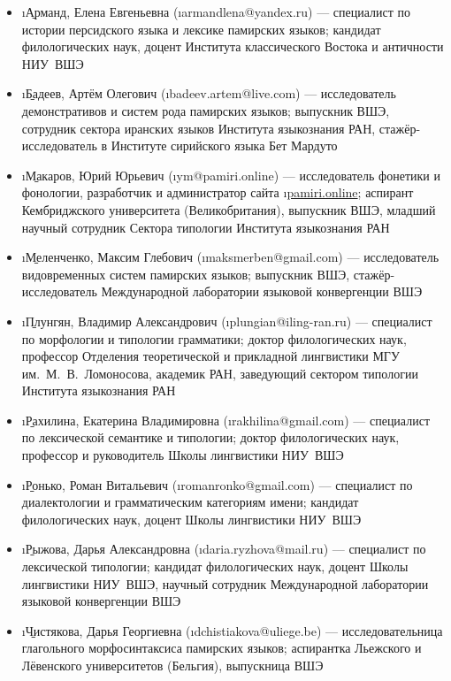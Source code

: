 {\small
\begin{itemize}
  \item \i{\b{Арманд}, Елена Евгеньевна} (\i{armandlena@yandex.ru}) — специалист по истории персидского языка и лексике памирских языков; кандидат филологических наук, доцент Института классического Востока и античности НИУ~ВШЭ
  \item \i{\b{Бадеев}, Артём Олегович} (\i{badeev.artem@live.com}) — исследователь демонстративов и систем рода памирских языков; выпускник ВШЭ, сотрудник сектора иранских языков Института языкознания РАН, стажёр-исследователь в Институте сирийского языка Бет Мардуто
  \item \i{\b{Макаров}, Юрий Юрьевич} (\i{ym@pamiri.online}) — исследователь фонетики и фонологии, разработчик и администратор сайта \i{\href{https://pamiri.online}{pamiri.online}}; аспирант Кембриджского университета (Великобритания), выпускник ВШЭ, младший научный сотрудник Сектора типологии Института языкознания РАН
  \item \i{\b{Меленченко}, Максим Глебович} (\i{maksmerben@gmail.com}) — исследователь видовременных систем памирских языков; выпускник ВШЭ, стажёр-исследователь Международной лаборатории языковой конвергенции ВШЭ
  \item \i{\b{Плунгян}, Владимир Александрович} (\i{plungian@iling-ran.ru}) — специалист по морфологии и типологии грамматики; доктор филологических наук, профессор Отделения теоретической и прикладной лингвистики МГУ им.~М.~В.~Ломоносова, академик РАН, заведующий сектором типологии Института языкознания РАН
  \item \i{\b{Рахилина}, Екатерина Владимировна} (\i{rakhilina@gmail.com}) — специалист по лексической семантике и типологии; доктор филологических наук, профессор и руководитель Школы лингвистики НИУ~ВШЭ
  \item \i{\b{Ронько}, Роман Витальевич} (\i{romanronko@gmail.com}) — специалист по диалектологии и грамматическим категориям имени; кандидат филологических наук, доцент Школы лингвистики НИУ~ВШЭ
  \item \i{\b{Рыжова}, Дарья Александровна} (\i{daria.ryzhova@mail.ru}) — специалист по лексической типологии; кандидат филологических наук, доцент Школы лингвистики НИУ~ВШЭ, научный сотрудник Международной лаборатории языковой конвергенции ВШЭ
  \item \i{\b{Чистякова}, Дарья Георгиевна} (\i{dchistiakova@uliege.be}) — исследовательница глагольного морфосинтаксиса памирских языков; аспирантка Льежского и Лёвенского университетов (Бельгия), выпускница ВШЭ
\end{itemize}}


